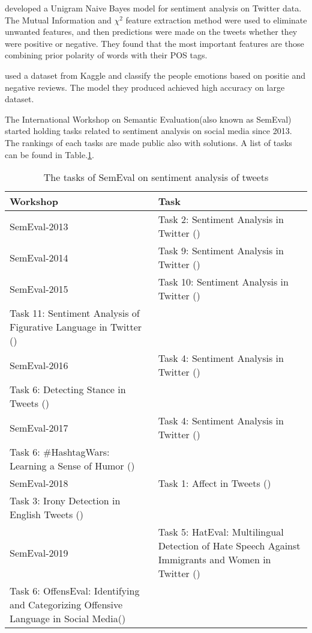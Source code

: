 \cite{opinionMiningLiang2013} developed a Unigram Naive Bayes model for
sentiment analysis on Twitter data. The Mutual Information and $\chi^2$ feature
extraction method were used to eliminate unwanted features, and then predictions
were made on the tweets whether they were positive or negative. They found that
the most important features are those combining prior polarity of words with
their POS tags.

\cite{bhavsar2019sentiment} used a dataset from Kaggle and classify the people
emotions based on positie and negative reviews. The model they produced achieved
high accuracy on large dataset.

The International Workshop on Semantic Evaluation(also known as SemEval)
started holding tasks related to sentiment analysis on social media since 2013.
The rankings of each tasks are made public also with solutions. A list of tasks
can be found in Table.\ref{table:SemEvalTasks}. %


\begin{table}[h]
  \caption{The tasks of SemEval on sentiment analysis of tweets}
  \label{table:SemEvalTasks}
  \centering
  \renewcommand{\tabularxcolumn}{m} %
  \begin{tabularx}{\textwidth}{l >{\raggedright}X}
    \toprule
    \textbf{Workshop} & \textbf{Task}
    \tabularnewline \midrule
    SemEval-2013
    &
    Task 2: Sentiment Analysis in Twitter (\cite{SemEval2013Task2})
    \tabularnewline \hline
    SemEval-2014
    &
    Task 9: Sentiment Analysis in Twitter (\cite{SemEval2014Task9})
    \tabularnewline \hline
    SemEval-2015
    &
    Task 10: Sentiment Analysis in Twitter (\cite{SemEval2015Task10})\\
    Task 11: Sentiment Analysis of Figurative Language in Twitter
    (\cite{SemEval2015Task11})
    \tabularnewline \hline
    SemEval-2016
    &
    Task 4: Sentiment Analysis in Twitter (\cite{SemEval2016Task4})\\
    Task 6: Detecting Stance in Tweets (\cite{SemEval2016Task6})
    \tabularnewline \hline
    SemEval-2017
    &
    Task 4: Sentiment Analysis in Twitter ()\\
    Task 6: \#HashtagWars: Learning a Sense of Humor ()
    \tabularnewline \hline
    SemEval-2018
    &
    Task 1: Affect in Tweets ()\\
    Task 3: Irony Detection in English Tweets ()
    \tabularnewline \hline
    SemEval-2019
    &
    Task 5: HatEval: Multilingual Detection of Hate Speech Against Immigrants
    and Women in Twitter ()\\
    Task 6: OffensEval: Identifying and Categorizing Offensive Language in
    Social Media()
    \tabularnewline \bottomrule
  \end{tabularx}
\end{table}
